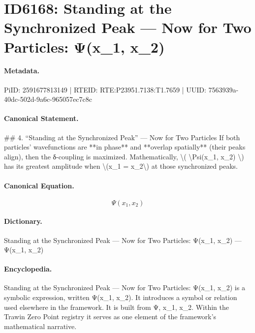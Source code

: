 \section*{ID6168: Standing at the Synchronized Peak — Now for Two Particles: Ψ(x\_1, x\_2)}
\paragraph{Metadata.}
PiID: 2591677813149 | RTEID: RTE:P23951.7138:T1.7659 | UUID: 7563939a-40dc-502d-9a6c-965057ec7c8c

\paragraph{Canonical Statement.}
\#\# 4. “Standing at the Synchronized Peak” — Now for Two Particles If both particles’ wavefunctions are **in phase** and **overlap spatially** (their peaks align), then the δ-coupling is maximized. Mathematically, \textbackslash{}( \textbackslash{}Psi(x\_1, x\_2) \textbackslash{}) has its greatest amplitude when \textbackslash{}(x\_1 = x\_2\textbackslash{}) at those synchronized peaks.

\paragraph{Canonical Equation.}
\[
\Psi(x_1, x_2)
\]

\paragraph{Dictionary.}
Standing at the Synchronized Peak — Now for Two Particles: Ψ(x\_1, x\_2) — Ψ(x\_1, x\_2)

\paragraph{Encyclopedia.}
Standing at the Synchronized Peak — Now for Two Particles: Ψ(x\_1, x\_2) is a symbolic expression, written Ψ(x\_1, x\_2). It introduces a symbol or relation used elsewhere in the framework. It is built from Ψ, x\_1, x\_2. Within the Trawin Zero Point registry it serves as one element of the framework's mathematical narrative.
